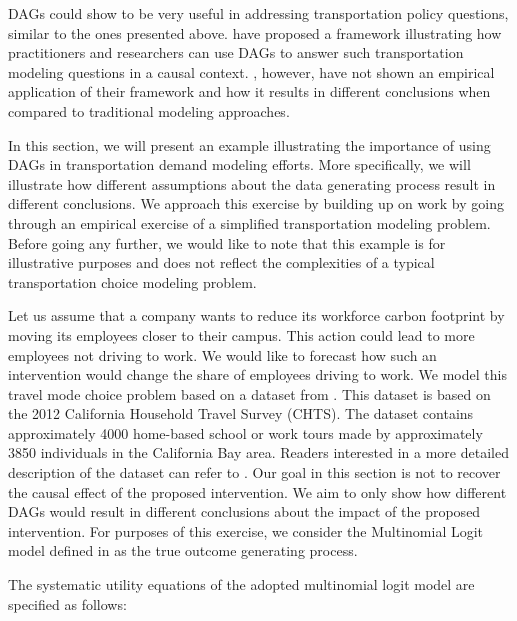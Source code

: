 
DAGs could show to be very useful in addressing transportation policy questions, similar to the ones presented above.
\citet{brathwaite_2018_causal} have proposed a framework illustrating how practitioners and researchers can use DAGs
 to answer such transportation modeling questions in a causal context.
\citet{brathwaite_2018_causal}, however, have not shown an empirical application of their framework and how it results
 in different conclusions when compared to traditional modeling approaches.

In this section, we will present an example illustrating the importance of using DAGs in transportation demand modeling efforts. 
More specifically, we will illustrate how different assumptions about the data generating process result in different conclusions.
We approach this exercise by building up on \citet{brathwaite_2018_causal} work by going through 
an empirical exercise of a simplified transportation modeling problem.
Before going any further, we would like to note that this example is for
illustrative purposes and does not reflect the complexities of a typical transportation choice modeling problem.

Let us assume that a company wants to reduce its workforce carbon footprint by moving its employees closer to their campus. 
This action could lead to more employees not driving to work.
We would like to forecast how such an intervention would change the share of employees driving to work.
We model this travel mode choice problem based on a dataset from \citet{brathwaite_asymmetric}.
This dataset is based on the 2012 California Household Travel Survey (CHTS).
The dataset contains approximately 4000 home-based school or work tours made by approximately 3850 individuals in the California Bay area.
Readers interested in a more detailed description of the dataset can refer to \citet{brathwaite_asymmetric}.
Our goal in this section is not to recover the causal effect of the proposed intervention.
We aim to only show how different DAGs would result in different conclusions about the impact of the proposed intervention.
For purposes of this exercise, we consider the Multinomial Logit model defined in \citet{brathwaite_asymmetric} as the true outcome generating process.

The systematic utility equations of the adopted multinomial logit model are specified as follows:

